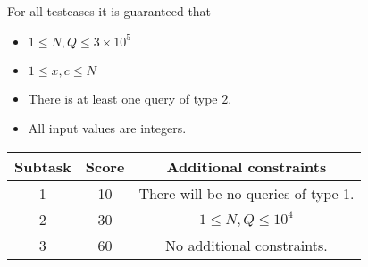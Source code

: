 For all testcases it is guaranteed that

\begin{itemize}
\item $1 \leq N, Q \leq 3 \times 10^5$

\item $1 \leq x, c \leq N$

\item There is at least one query of type $2$.

\item All input values are integers.
\end{itemize}

\begin{center}
\begin{tabular}{|c|c|c|} 
\hline
\textbf{Subtask} & \textbf{Score} & \textbf{Additional constraints} \\
\hline
1 & 10 & There will be no queries of type 1. \\
\hline
2 & 30 & $1 \leq N, Q \leq 10^4$ \\ 
\hline
3 & 60 & No additional constraints. \\
\hline
\end{tabular}
\end{center}